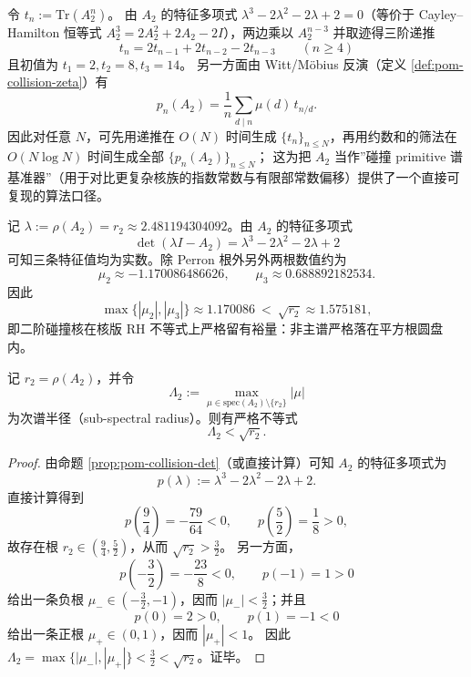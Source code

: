 \begin{remark}\label{rem:pom-a2-primitive-fast}
令 \(t_n:=\mathrm{Tr}(A_2^n)\)。
由 \(A_2\) 的特征多项式 \(\lambda^3-2\lambda^2-2\lambda+2=0\)（等价于 Cayley--Hamilton 恒等式 \(A_2^3=2A_2^2+2A_2-2I\)），两边乘以 \(A_2^{n-3}\) 并取迹得三阶递推
\[
\boxed{\;
t_n=2t_{n-1}+2t_{n-2}-2t_{n-3}\qquad(n\ge 4)\;}
\]
且初值为 \(t_1=2,t_2=8,t_3=14\)。
另一方面由 Witt/Möbius 反演（定义 \ref{def:pom-collision-zeta}）有
\[
p_n(A_2)=\frac{1}{n}\sum_{d\mid n}\mu(d)\,t_{n/d}.
\]
因此对任意 \(N\)，可先用递推在 \(O(N)\) 时间生成 \(\{t_n\}_{n\le N}\)，再用约数和的筛法在 \(O(N\log N)\) 时间生成全部 \(\{p_n(A_2)\}_{n\le N}\)；
这为把 \(A_2\) 当作”碰撞 primitive 谱基准器”（用于对比更复杂核族的指数常数与有限部常数偏移）提供了一个直接可复现的算法口径。
\end{remark}

\begin{remark}\label{rem:pom-collision-rh-margin}
记 \(\lambda:=\rho(A_2)=r_2\approx 2.481194304092\)。由 \(A_2\) 的特征多项式
\[
\det(\lambda I-A_2)=\lambda^3-2\lambda^2-2\lambda+2
\]
可知三条特征值均为实数。除 Perron 根外另外两根数值约为
\[
\mu_2\approx -1.170086486626,\qquad
\mu_3\approx 0.688892182534.
\]
因此
\[
\max\{|\mu_2|,|\mu_3|\}\approx 1.170086\ <\ \sqrt{r_2}\approx 1.575181,
\]
即二阶碰撞核在核版 RH 不等式上严格留有裕量：非主谱严格落在平方根圆盘内。
\end{remark}

\begin{proposition}\label{prop:pom-a2-strict-rh-certificate}
记 \(r_2=\rho(A_2)\)，并令
\[
\Lambda_2:=\max_{\mu\in\mathrm{spec}(A_2)\setminus\{r_2\}}|\mu|
\]
为次谱半径（sub-spectral radius）。则有严格不等式
\[
\boxed{\;\Lambda_2<\sqrt{r_2}.\;}
\]
\end{proposition}
\begin{proof}
由命题 \ref{prop:pom-collision-det}（或直接计算）可知 \(A_2\) 的特征多项式为
\[
p(\lambda):=\lambda^3-2\lambda^2-2\lambda+2.
\]
直接计算得到
\[
p\!\left(\frac94\right)=-\frac{79}{64}<0,\qquad
p\!\left(\frac52\right)=\frac18>0,
\]
故存在根 \(r_2\in\left(\frac94,\frac52\right)\)，从而 \(\sqrt{r_2}>\frac32\)。
另一方面，
\[
p\!\left(-\frac32\right)=-\frac{23}{8}<0,\qquad p(-1)=1>0
\]
给出一条负根 \(\mu_-\in\left(-\frac32,-1\right)\)，因而 \(|\mu_-|<\frac32\)；并且
\[
p(0)=2>0,\qquad p(1)=-1<0
\]
给出一条正根 \(\mu_+\in(0,1)\)，因而 \(|\mu_+|<1\)。
因此 \(\Lambda_2=\max\{|\mu_-|,|\mu_+|\}<\frac32<\sqrt{r_2}\)。证毕。
\end{proof}

